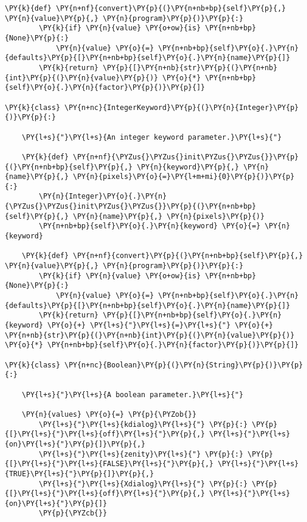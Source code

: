 \begin{Verbatim}[commandchars=\\\{\}]
    \PY{k}{def} \PY{n+nf}{convert}\PY{p}{(}\PY{n+nb+bp}{self}\PY{p}{,} \PY{n}{value}\PY{p}{,} \PY{n}{program}\PY{p}{)}\PY{p}{:}
        \PY{k}{if} \PY{n}{value} \PY{o+ow}{is} \PY{n+nb+bp}{None}\PY{p}{:}
            \PY{n}{value} \PY{o}{=} \PY{n+nb+bp}{self}\PY{o}{.}\PY{n}{defaults}\PY{p}{[}\PY{n+nb+bp}{self}\PY{o}{.}\PY{n}{name}\PY{p}{]}
        \PY{k}{return} \PY{p}{[}\PY{n+nb}{str}\PY{p}{(}\PY{n+nb}{int}\PY{p}{(}\PY{n}{value}\PY{p}{)} \PY{o}{*} \PY{n+nb+bp}{self}\PY{o}{.}\PY{n}{factor}\PY{p}{)}\PY{p}{]}

\PY{k}{class} \PY{n+nc}{IntegerKeyword}\PY{p}{(}\PY{n}{Integer}\PY{p}{)}\PY{p}{:}

    \PY{l+s}{"}\PY{l+s}{An integer keyword parameter.}\PY{l+s}{"}

    \PY{k}{def} \PY{n+nf}{\PYZus{}\PYZus{}init\PYZus{}\PYZus{}}\PY{p}{(}\PY{n+nb+bp}{self}\PY{p}{,} \PY{n}{keyword}\PY{p}{,} \PY{n}{name}\PY{p}{,} \PY{n}{pixels}\PY{o}{=}\PY{l+m+mi}{0}\PY{p}{)}\PY{p}{:}
        \PY{n}{Integer}\PY{o}{.}\PY{n}{\PYZus{}\PYZus{}init\PYZus{}\PYZus{}}\PY{p}{(}\PY{n+nb+bp}{self}\PY{p}{,} \PY{n}{name}\PY{p}{,} \PY{n}{pixels}\PY{p}{)}
        \PY{n+nb+bp}{self}\PY{o}{.}\PY{n}{keyword} \PY{o}{=} \PY{n}{keyword}

    \PY{k}{def} \PY{n+nf}{convert}\PY{p}{(}\PY{n+nb+bp}{self}\PY{p}{,} \PY{n}{value}\PY{p}{,} \PY{n}{program}\PY{p}{)}\PY{p}{:}
        \PY{k}{if} \PY{n}{value} \PY{o+ow}{is} \PY{n+nb+bp}{None}\PY{p}{:}
            \PY{n}{value} \PY{o}{=} \PY{n+nb+bp}{self}\PY{o}{.}\PY{n}{defaults}\PY{p}{[}\PY{n+nb+bp}{self}\PY{o}{.}\PY{n}{name}\PY{p}{]}
        \PY{k}{return} \PY{p}{[}\PY{n+nb+bp}{self}\PY{o}{.}\PY{n}{keyword} \PY{o}{+} \PY{l+s}{"}\PY{l+s}{=}\PY{l+s}{"} \PY{o}{+} \PY{n+nb}{str}\PY{p}{(}\PY{n+nb}{int}\PY{p}{(}\PY{n}{value}\PY{p}{)} \PY{o}{*} \PY{n+nb+bp}{self}\PY{o}{.}\PY{n}{factor}\PY{p}{)}\PY{p}{]}

\PY{k}{class} \PY{n+nc}{Boolean}\PY{p}{(}\PY{n}{String}\PY{p}{)}\PY{p}{:}

    \PY{l+s}{"}\PY{l+s}{A boolean parameter.}\PY{l+s}{"}

    \PY{n}{values} \PY{o}{=} \PY{p}{\PYZob{}}
        \PY{l+s}{"}\PY{l+s}{kdialog}\PY{l+s}{"} \PY{p}{:} \PY{p}{[}\PY{l+s}{"}\PY{l+s}{off}\PY{l+s}{"}\PY{p}{,} \PY{l+s}{"}\PY{l+s}{on}\PY{l+s}{"}\PY{p}{]}\PY{p}{,}
        \PY{l+s}{"}\PY{l+s}{zenity}\PY{l+s}{"} \PY{p}{:} \PY{p}{[}\PY{l+s}{"}\PY{l+s}{FALSE}\PY{l+s}{"}\PY{p}{,} \PY{l+s}{"}\PY{l+s}{TRUE}\PY{l+s}{"}\PY{p}{]}\PY{p}{,}
        \PY{l+s}{"}\PY{l+s}{Xdialog}\PY{l+s}{"} \PY{p}{:} \PY{p}{[}\PY{l+s}{"}\PY{l+s}{off}\PY{l+s}{"}\PY{p}{,} \PY{l+s}{"}\PY{l+s}{on}\PY{l+s}{"}\PY{p}{]}
        \PY{p}{\PYZcb{}}


\end{Verbatim}
